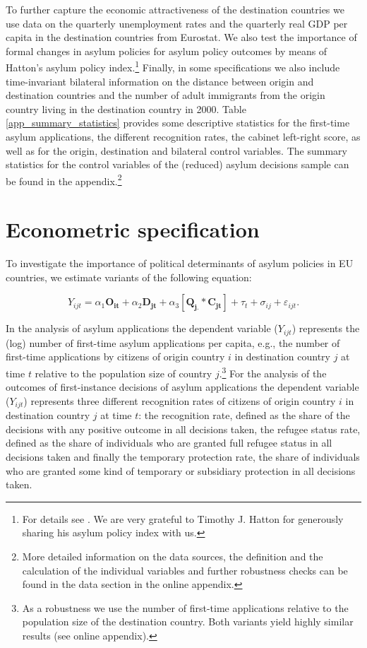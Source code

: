\documentclass[a4paper,12pt]{article}
\begin{document}
To further capture the economic attractiveness of the destination countries we use data on the quarterly unemployment rates and the quarterly real GDP per capita in the destination countries from Eurostat. We also test the importance of formal changes in asylum policies for asylum policy outcomes by means of Hatton's asylum policy index.\footnote{For details see \citet{hatton2009}. We are very grateful to Timothy J. Hatton for generously sharing his asylum policy index with us.} Finally, in some specifications we also include time-invariant bilateral information on the distance between origin and destination countries and the number of adult immigrants from the origin country living in the destination country in 2000. Table \ref{app_summary_statistics} provides some descriptive statistics for the first-time asylum applications, 
the different recognition rates, the cabinet left-right score, as well as for the origin, destination and bilateral control variables. The summary statistics for the control variables of the (reduced) asylum decisions sample can be found in the appendix.\footnote{More detailed information on the data sources, the definition and the calculation of the individual variables and further robustness checks can be found in the data section in the online appendix.}




\section{Econometric specification} \label{sec:econometric}

To investigate the importance of political determinants of asylum policies in EU countries, we estimate variants of the following equation:

\begin{equation}
Y_{ijt} =\alpha_1 \mathbf{O_{it}} + \alpha_2 \mathbf{D_{jt}} + \alpha_3 [\mathbf{Q_{j.}} *  \mathbf{C_{jt}}] + \tau_t + \sigma_{ij} +  \varepsilon_{ijt}.
\end{equation}

In the analysis of asylum applications the dependent variable ($Y_{ijt}$) represents the (log) number of first-time asylum applications per capita, e.g., the number of first-time applications by citizens of origin country $i$ in destination country $j$ at time $t$ relative to the population size of country $j$.\footnote{As a robustness we use the number of first-time applications relative to the population size of the destination country. Both variants yield highly similar results (see online appendix).} For the analysis of the outcomes of first-instance decisions of asylum applications the dependent variable ($Y_{ijt}$) represents three different recognition rates of citizens of origin country $i$ in destination country $j$ at time $t$: the recognition rate, defined as the share of the decisions with any positive outcome in all decisions taken, the refugee status rate, defined as the share of individuals who are granted full refugee status in all decisions taken and finally the temporary protection rate, the share of individuals who are granted some kind of temporary or subsidiary protection in all decisions taken. 
\end{document}
